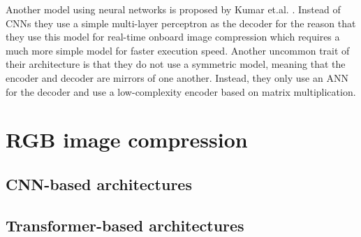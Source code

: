 Another model using neural networks is proposed by Kumar et.al. \citep{leal-taixe_onboard_2019}. Instead of CNNs they use a simple multi-layer perceptron as the decoder for the reason that they use this model for real-time onboard image compression which requires a much more simple model for faster execution speed. Another uncommon trait of their architecture is that they do not use a symmetric model, meaning that the encoder and decoder are mirrors of one another. Instead, they only use an ANN for the decoder and use a low-complexity encoder based on matrix multiplication.


\section{RGB image compression \label{sec:ch2rgb}}
\subsection{CNN-based architectures}
\subsection{Transformer-based architectures}